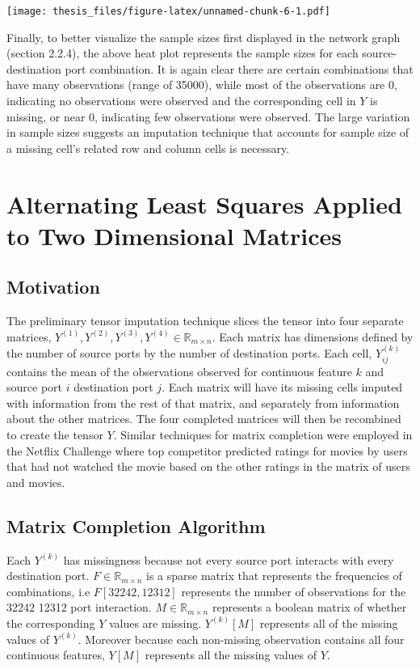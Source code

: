 \documentclass[12pt,twoside]{dukestatscithesis}
\theoremstyle{definition}
\theoremstyle{definition}
\theoremstyle{definition}
\theoremstyle{remark}
\begin{document}
\texttt{[image: thesis\_files/figure-latex/unnamed-chunk-6-1.pdf]}

Finally, to better visualize the sample sizes first displayed in the
network graph (section 2.2.4), the above heat plot represents the sample
sizes for each source-destination port combination. It is again clear
there are certain combinations that have many observations (range of
35000), while most of the observations are 0, indicating no observations
were observed and the corresponding cell in \(Y\) is missing, or near 0,
indicating few observations were observed. The large variation in sample
sizes suggests an imputation technique that accounts for sample size of
a missing cell's related row and column cells is necessary.

\chapter{Alternating Least Squares Applied to Two Dimensional
Matrices}\label{alternating-least-squares-applied-to-two-dimensional-matrices}

\section{Motivation}\label{motivation-1}

The preliminary tensor imputation technique slices the tensor into four
separate matrices,
\(Y^{(1)}, Y^{(2)}, Y^{(3)}, Y^{(4)} \in \mathbb{R}_{m \times n}\). Each
matrix has dimensions defined by the number of source ports by the
number of destination ports. Each cell, \(Y^{(k)}_{ij}\) contains the
mean of the observations observed for continuous feature \(k\) and
source port \(i\) destination port \(j\). Each matrix will have its
missing cells imputed with information from the rest of that matrix, and
separately from information about the other matrices. The four completed
matrices will then be recombined to create the tensor \(Y\). Similar
techniques for matrix completion were employed in the Netflix Challenge
where top competitor predicted ratings for movies by users that had not
watched the movie based on the other ratings in the matrix of users and
movies.

\section{Matrix Completion Algorithm}\label{matrix-completion-algorithm}

Each \(Y^{(k)}\) has missingness because not every source port interacts
with every destination port. \(F \in \mathbb{R}_{m \times n}\) is a
sparse matrix that represents the frequencies of combinations, i.e
\(F[32242,12312]\) represents the number of observations for the 32242
12312 port interaction. \(M \in \mathbb{R}_{m \times n}\) represents a
boolean matrix of whether the corresponding \(Y\) values are missing.
\(Y^{(k)}[M]\) represents all of the missing values of \(Y^{(k)}\).
Moreover because each non-missing observation contains all four
continuous features, \(Y[M]\) represents all the missing values of
\(Y\).
\end{document}
